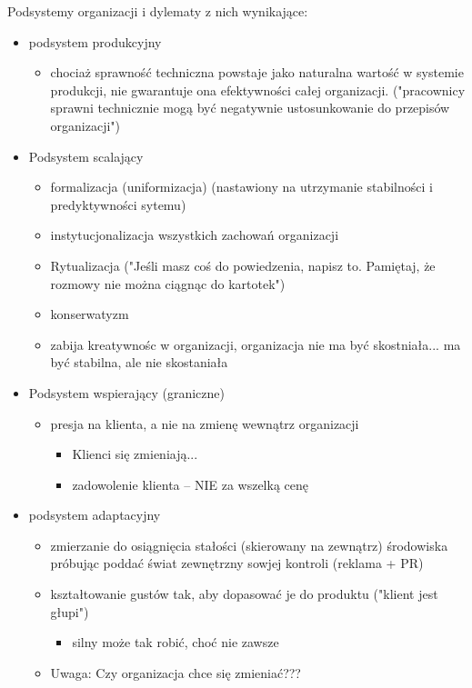 \documentclass[a4paper,10pt]{report}
\begin{document}
\noindent Podsystemy organizacji i dylematy z nich wynikające:
\begin{itemize}
	\item podsystem produkcyjny
	\begin{itemize}
		\item chociaż sprawność techniczna powstaje jako naturalna wartość w systemie produkcji, nie gwarantuje ona efektywności całej organizacji. ("pracownicy sprawni technicznie mogą być negatywnie ustosunkowanie do przepisów organizacji")
	\end{itemize} 
	\item Podsystem scalający
	\begin{itemize}
		\item formalizacja (uniformizacja) (nastawiony na utrzymanie stabilności i predyktywności sytemu)
		\item instytucjonalizacja wszystkich zachowań organizacji
		\item Rytualizacja ("Jeśli masz coś do powiedzenia, napisz to. Pamiętaj, że rozmowy nie można ciągnąc do kartotek")
		\item konserwatyzm
		\item zabija kreatywnośc w organizacji, organizacja nie ma być skostniała... ma być stabilna, ale nie skostaniała
	\end{itemize}
	\item Podsystem wspierający (graniczne)
	\begin{itemize}
		\item presja na klienta, a nie na zmienę wewnątrz organizacji
		\begin{itemize}
			\item Klienci się zmieniają...
			\item zadowolenie klienta -- NIE za wszelką cenę
		\end{itemize}
	\end{itemize}
	\item podsystem adaptacyjny
	\begin{itemize}
		\item zmierzanie do osiągnięcia stałości (skierowany na zewnątrz) środowiska próbując poddać świat zewnętrzny sowjej kontroli (reklama + PR)
		\item kształtowanie gustów tak, aby dopasować je do produktu ("klient jest głupi")
		\begin{itemize}
			\item silny może tak robić, choć nie zawsze
		\end{itemize}
		\item Uwaga: Czy organizacja chce się zmieniać???

\end{itemize}
\end{itemize}
\end{document}
